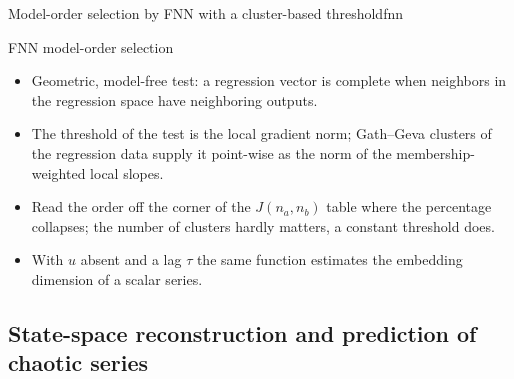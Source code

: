 \begin{algobox}{Model-order selection by FNN with a cluster-based threshold}{fnn}
\begin{algorithm}[H]
\end{algorithm}
\end{algobox}
\begin{summarybox}{FNN model-order selection}
\begin{itemize}
  \item Geometric, model-free test: a regression vector is complete when neighbors in the regression space have neighboring outputs.
  \item The threshold of the test is the local gradient norm; Gath--Geva clusters of the regression data supply it point-wise as the norm of the membership-weighted local slopes.
  \item Read the order off the corner of the $J(n_a,n_b)$ table where the percentage collapses; the number of clusters hardly matters, a constant threshold does.
  \item With $u$ absent and a lag $\tau$ the same function estimates the embedding dimension of a scalar series.
\end{itemize}
\end{summarybox}

\subsection{State-space reconstruction and prediction of chaotic series}\label{sec:ts:chaotic}

